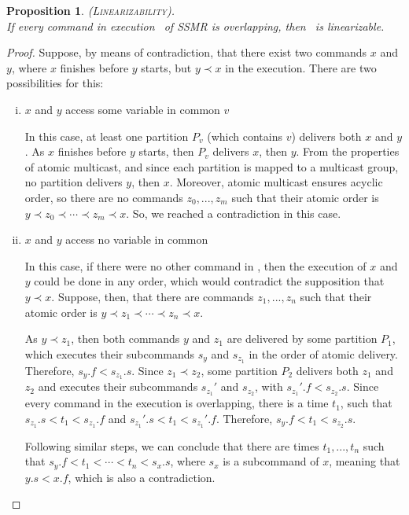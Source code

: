 \documentclass{usiinftr}
\newtheorem{props}{Proposition}
\begin{document}
\begin{props}
\textsc{(Linearizability)}.\\If every command in execution \ex\ of SSMR is overlapping, then \ex\ is linearizable.
\end{props}


\begin{proof}
Suppose, by means of contradiction, that there exist two commands $x$ and $y$, where $x$ finishes before $y$ starts, but $y \prec x$ in the execution. There are two possibilities for this:

\begin{enumerate}[i)]

\item $x$ and $y$ access some variable in common $v$

In this case, at least one partition $P_v$ (which contains $v$) delivers both $x$ and $y$. As $x$ finishes before $y$ starts, then $P_v$ delivers $x$, then $y$. From the properties of atomic multicast, and since each partition is mapped to a multicast group, no partition delivers $y$, then $x$. Moreover, atomic multicast ensures acyclic order, so there are no commands $z_0, ..., z_m$ such that their atomic order is $y \prec z_0 \prec \cdots \prec z_m \prec x$. So, we reached a contradiction in this case.

\item $x$ and $y$ access no variable in common

In this case, if there were no other command in \ex, then the execution of $x$ and $y$ could be done in any order, which would contradict the supposition that $y \prec x$. Suppose, then, that there are commands $z_1, ..., z_n$ such that their atomic order is $y \prec z_1 \prec \cdots \prec z_n \prec x$.

As $y \prec z_1$, then both commands $y$ and $z_1$ are delivered by some partition $P_1$, which executes their subcommands $s_y$ and $s_{z_1}$ in the order of atomic delivery. Therefore, $s_y.f < s_{z_1}.s$. Since $z_1 \prec z_2$, some partition $P_2$ delivers both $z_1$ and $z_2$ and executes their subcommands $s_{z_1}'$ and $s_{z_2}$, with $s_{z_1}'.f < s_{z_2}.s$. Since every command in the execution is overlapping, there is a time $t_1$, such that $s_{z_1}.s < t_1 < s_{z_1}.f$ and $s_{z_1}'.s < t_1 < s_{z_1}'.f$. Therefore, $s_y.f < t_1 < s_{z_2}.s$.

Following similar steps, we can conclude that there are times $t_1, ..., t_n$ such that $s_y.f < t_1 < \cdots < t_n < s_x.s$, where $s_x$ is a subcommand of $x$, meaning that $y.s < x.f$, which is also a contradiction.

\end{enumerate}

\end{proof}
\end{document}
